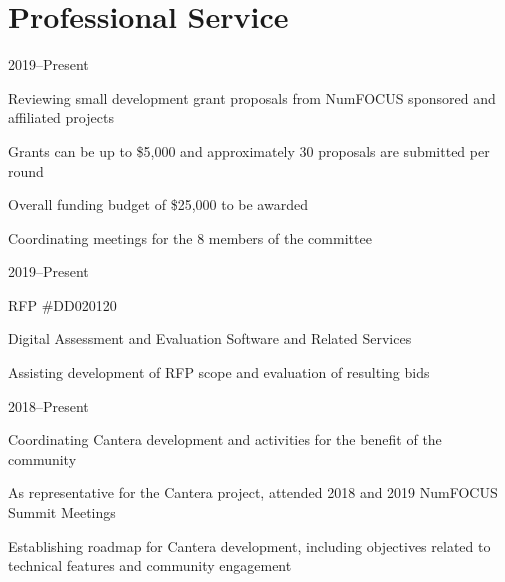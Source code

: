 \vspace{\baselineskip}

\section{{\sectionfont Professional Service}}

\begin{lonelist}
    \item[]  \hfill 2019--Present\\
    \begin{innerlist}
        \item Reviewing small development grant proposals from NumFOCUS sponsored and affiliated projects
        \item Grants can be up to \$5,000 and approximately 30 proposals are submitted per round
        \item Overall funding budget of \$25,000 to be awarded
        \item Coordinating meetings for the 8 members of the committee
    \end{innerlist}
    \item[]  \hfill 2019--Present\\
    \begin{innerlist}
        \item RFP \#DD020120
        \item Digital Assessment and Evaluation Software and Related Services
        \item Assisting development of RFP scope and evaluation of resulting bids
    \end{innerlist}
    \item[]  \hfill 2018--Present\\

    \begin{innerlist}
        \item Coordinating Cantera development and activities for the benefit of the community
        \item As representative for the Cantera project, attended 2018 and 2019 NumFOCUS Summit Meetings
        \item Establishing roadmap for Cantera development, including objectives related to technical features and community engagement
    \end{innerlist}


\end{lonelist}
